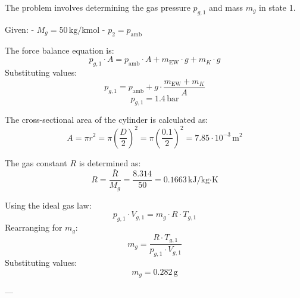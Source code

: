 The problem involves determining the gas pressure \( p_{g,1} \) and mass \( m_g \) in state 1.  

Given:  
- \( M_g = 50 \, \text{kg/kmol} \)  
- \( p_2 = p_{\text{amb}} \)  

The force balance equation is:  
\[
p_{g,1} \cdot A = p_{\text{amb}} \cdot A + m_{\text{EW}} \cdot g + m_K \cdot g
\]  
Substituting values:  
\[
p_{g,1} = p_{\text{amb}} + g \cdot \frac{m_{\text{EW}} + m_K}{A}
\]  
\[
p_{g,1} = 1.4 \, \text{bar}
\]  

The cross-sectional area of the cylinder is calculated as:  
\[
A = \pi r^2 = \pi \left(\frac{D}{2}\right)^2 = \pi \left(\frac{0.1}{2}\right)^2 = 7.85 \cdot 10^{-3} \, \text{m}^2
\]  

The gas constant \( R \) is determined as:  
\[
R = \frac{\bar{R}}{M_g} = \frac{8.314}{50} = 0.1663 \, \text{kJ/kg·K}
\]  

Using the ideal gas law:  
\[
p_{g,1} \cdot V_{g,1} = m_g \cdot R \cdot T_{g,1}
\]  
Rearranging for \( m_g \):  
\[
m_g = \frac{R \cdot T_{g,1}}{p_{g,1} \cdot V_{g,1}}
\]  
Substituting values:  
\[
m_g = 0.282 \, \text{g}
\]  

---